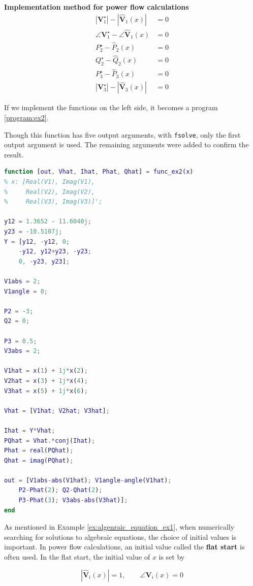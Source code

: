 \documentclass[graybox, envcountchap]{svmult}
\begin{document}
\begin{example}{\textbf{Implementation method for power flow
calculations}}
\begin{equation*}
  \begin{aligned}
    |\bm V_1^{\star}|-|\hat{\bm V}_1(x)| &= 0\\
    \angle \bm V_1^{\star} - \angle \hat{\bm V}_1(x) &= 0\\
    P_2^{\star} -\hat P_2(x) &= 0\\
    Q_2^{\star} -\hat Q_2(x) &= 0\\
    P_3^{\star} -\hat P_3(x) &= 0\\
    |\bm V_3^{\star}|-|\hat{\bm V}_3(x)| &= 0
  \end{aligned}
\end{equation*}

If we implement the functions on the left side, it becomes a program \nobreak\ref{program:ex2}.

Though this function has five output arguments, with \texttt{fsolve}, only the first output argument is used.
The remaining arguments were added to confirm the result.

\begin{lstlisting}[language=Matlab, caption=func\_ex2.m, label={program:ex2}]
function [out, Vhat, Ihat, Phat, Qhat] = func_ex2(x)
% x: [Real(V1), Imag(V1),
%     Real(V2), Imag(V2),
%     Real(V3), Imag(V3)]';

y12 = 1.3652 - 11.6040j;
y23 = -10.5107j;
Y = [y12, -y12, 0;
    -y12, y12+y23, -y23;
    0, -y23, y23];

V1abs = 2;
V1angle = 0;

P2 = -3;
Q2 = 0;

P3 = 0.5;
V3abs = 2;

V1hat = x(1) + 1j*x(2);
V2hat = x(3) + 1j*x(4);
V3hat = x(5) + 1j*x(6);

Vhat = [V1hat; V2hat; V3hat];

Ihat = Y*Vhat;
PQhat = Vhat.*conj(Ihat);
Phat = real(PQhat);
Qhat = imag(PQhat);

out = [V1abs-abs(V1hat); V1angle-angle(V1hat);
    P2-Phat(2); Q2-Qhat(2);
    P3-Phat(3); V3abs-abs(V3hat)];
end
\end{lstlisting}

As mentioned in Example \ref{ex:algenraic_equation_ex1}, when numerically
searching for solutions to algebraic equations, the choice of initial values is
important. In power flow calculations, an initial value called the \textbf{flat
start} is often used. In the flat start, the initial value of $x$ is set by

\[
  |\hat{\bm V}_i(x)|=1
  ,\qquad
  \angle \bm V_i(x) = 0
\]


\end{example}
\end{document}

